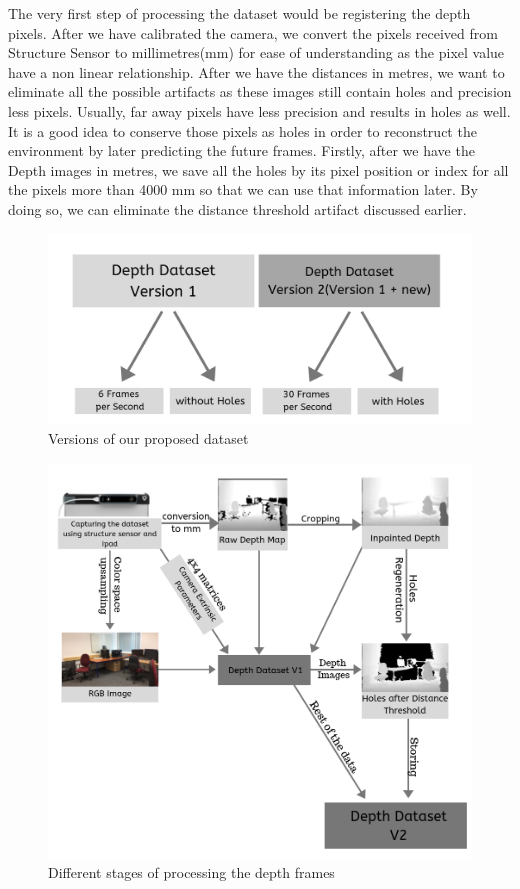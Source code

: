 The very first step of processing the dataset would be registering the depth pixels. After we have calibrated the camera, we convert the pixels received from Structure Sensor to millimetres(mm) for ease of understanding as the pixel value have a non linear relationship. After we have the distances in metres, we want to eliminate all the possible artifacts as these images still contain holes and precision less pixels. Usually, far away pixels have less precision and results in holes as well\cite{deptherror}. It is a good idea to conserve those pixels as holes in order to reconstruct the environment by later predicting the future frames. Firstly, after we have the Depth images in metres, we save all the holes by its pixel position or index for all the pixels more than 4000 mm so that we can use that information later. By doing so, we can eliminate the distance threshold artifact discussed earlier.

\begin{figure}[h]
    \centering
    \includegraphics[scale=0.35]{Figures/versions.png}
    \caption{Versions of our proposed dataset}
    \label{fig:datasetversion}
\end{figure}

\begin{figure}[h]
    \includegraphics[scale=0.50]{Figures/process.png}
    \caption{Different stages of processing the depth frames}
    \label{fig:processing}
\end{figure}

